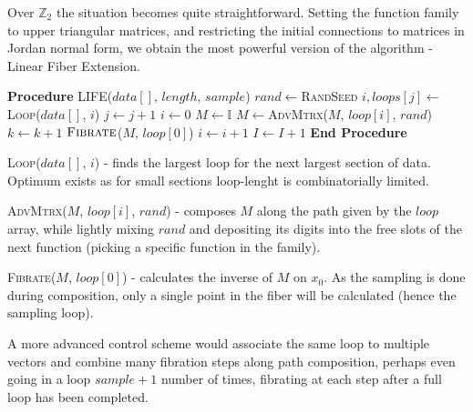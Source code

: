 \documentclass{article}
\begin{document}
Over $\mathbb{Z}_2$ the situation becomes quite straightforward. Setting the function family to upper triangular matrices, and restricting the initial connections to matrices in Jordan normal form, we obtain the most powerful version of the algorithm - Linear Fiber Extension.
\newpage
\begin{algorithm}
\caption{LiFE}
\begin{algorithmic}[1]
    \STATE \textbf{Procedure} \textsc{LIFE}($data[ ]$, $length$, $sample$)
    \STATE $rand\gets$\textsc{RandSeed}
        \STATE $i, loops[j]\gets $\textsc{Loop}($data[ ]$, $i$)
        \STATE $j \gets j + 1$
    \ENDWHILE
        \STATE $i \gets 0$
        \STATE $M \gets \mathbb{I}$
                 \STATE $M\gets$\textsc{AdvMtrx}($M$, $loop[i]$, $rand$)
                 \STATE $k\gets k+1$
            \ENDWHILE
            \STATE $\textsc{Fibrate}$($M$, $loop[0]$)
            \STATE $i\gets i+1$
        \ENDWHILE
        \STATE $I\gets I+1$
    \ENDWHILE
    \STATE \textbf{End Procedure}
\end{algorithmic}
\end{algorithm}

\textsc{Loop}($data[ ]$, $i$) - finds the largest loop for the next largest section of data. Optimum exists as for small sections loop-lenght is combinatorially limited.

\textsc{AdvMtrx}($M$, $loop[i]$, $rand$) - composes $M$ along the path given by the $loop$ array, while lightly mixing $rand$ and depositing its digits into the free slots of the next function (picking a specific function in the family).

\textsc{Fibrate}($M$, $loop[0]$) - calculates the inverse of $M$ on $x_0$.  As the sampling is done during composition, only a single point in the fiber will be calculated (hence the sampling loop).

A more advanced control scheme would associate the same loop to multiple vectors and combine many fibration steps along path composition, perhaps even going in a loop $sample + 1$ number of times, fibrating at each step after a full loop has been completed.
\end{document}
